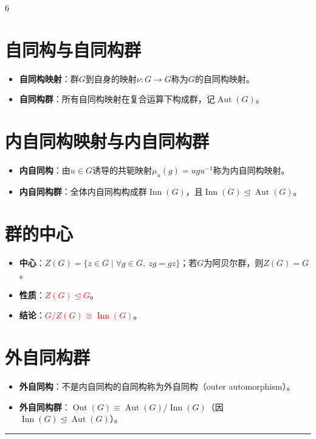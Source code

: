 \documentclass[landscape]{article}
\begin{document}
\begin{multicols*}{6}
\section*{自同构与自同构群}
\begin{itemize}
  \item \textbf{自同构映射}：群$G$到自身的映射$\nu:G\to G$称为$G$的自同构映射。
  \item \textbf{自同构群}：所有自同构映射在复合运算下构成群，记$\operatorname{Aut}(G)$。
\end{itemize}

\section*{内自同构映射与内自同构群}
\begin{itemize}
  \item \textbf{内自同构}：由$u\in G$诱导的共轭映射$\mu_u(g)=ugu^{-1}$称为内自同构映射。
  \item \textbf{内自同构群}：全体内自同构构成群$\operatorname{Inn}(G)$，且$\operatorname{Inn}(G)\trianglelefteq \operatorname{Aut}(G)$。
\end{itemize}

\section*{群的中心}
\begin{itemize}
  \item \textbf{中心}：$Z(G)=\{z\in G\mid \forall g\in G,\ zg=gz\}$；若$G$为阿贝尔群，则$Z(G)=G$。
  \item \textbf{性质}：\textcolor{red}{$Z(G)\trianglelefteq G$}。
  \item \textbf{结论}：\textcolor{red}{$G/Z(G)\cong \operatorname{Inn}(G)$}。
\end{itemize}

\section*{外自同构群}
\begin{itemize}
  \item \textbf{外自同构}：不是内自同构的自同构称为外自同构（outer automorphism）。
  \item \textbf{外自同构群}：$\operatorname{Out}(G)\equiv \operatorname{Aut}(G)/\operatorname{Inn}(G)$（因$\operatorname{Inn}(G)\trianglelefteq \operatorname{Aut}(G)$）。
\end{itemize}
\noindent\textcolor{red}{\rule{\linewidth}{1pt}}

\end{multicols*}
\end{document}
